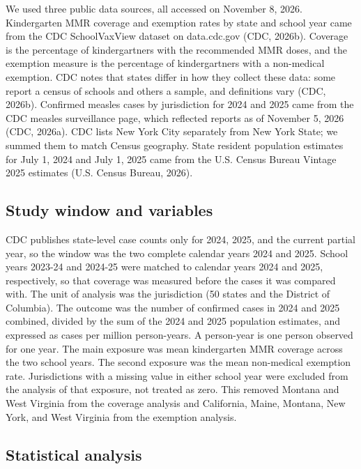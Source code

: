 \documentclass[12pt]{article}
\begin{document}
We used three public data sources, all accessed on November 8, 2026. Kindergarten MMR coverage and exemption rates by state and school year came from the CDC SchoolVaxView dataset on data.cdc.gov (CDC, 2026b). Coverage is the percentage of kindergartners with the recommended MMR doses, and the exemption measure is the percentage of kindergartners with a non-medical exemption. CDC notes that states differ in how they collect these data: some report a census of schools and others a sample, and definitions vary (CDC, 2026b). Confirmed measles cases by jurisdiction for 2024 and 2025 came from the CDC measles surveillance page, which reflected reports as of November 5, 2026 (CDC, 2026a). CDC lists New York City separately from New York State; we summed them to match Census geography. State resident population estimates for July 1, 2024 and July 1, 2025 came from the U.S. Census Bureau Vintage 2025 estimates (U.S. Census Bureau, 2026).

\subsection*{Study window and variables}

CDC publishes state-level case counts only for 2024, 2025, and the current partial year, so the window was the two complete calendar years 2024 and 2025. School years 2023-24 and 2024-25 were matched to calendar years 2024 and 2025, respectively, so that coverage was measured before the cases it was compared with. The unit of analysis was the jurisdiction (50 states and the District of Columbia). The outcome was the number of confirmed cases in 2024 and 2025 combined, divided by the sum of the 2024 and 2025 population estimates, and expressed as cases per million person-years. A person-year is one person observed for one year. The main exposure was mean kindergarten MMR coverage across the two school years. The second exposure was the mean non-medical exemption rate. Jurisdictions with a missing value in either school year were excluded from the analysis of that exposure, not treated as zero. This removed Montana and West Virginia from the coverage analysis and California, Maine, Montana, New York, and West Virginia from the exemption analysis.

\subsection*{Statistical analysis}
\end{document}
